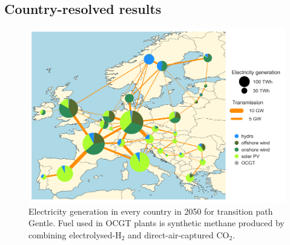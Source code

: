 \documentclass[3p]{elsarticle} %
\begin{document}
\FloatBarrier

\clearpage
\subsection{Country-resolved results}

\begin{figure}[!h]
\centering
\includegraphics[width=0.8\columnwidth]{../figures/spatial_electricity_generation_Base.png}
\caption{Electricity generation in every country in 2050 for transition path Gentle. Fuel used in OCGT plants is synthetic methane produced by combining electrolysed-H$_2$ and direct-air-captured CO$_2$.} \label{fig_spatial_plot} 
\end{figure}
\end{document}

